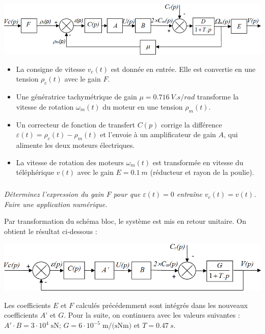 \documentclass[10pt,fleqn]{article} %
\begin{document}
\begin{multicols}{2}
\begin{center}
	\includegraphics[width=\linewidth]{images2/fig_04}
\end{center}

\begin{itemize}
\item La consigne de vitesse $v_c(t)$ est donnée en entrée. Elle est convertie en une tension $\rho_c(t)$ avec le gain $F$.
\item Une génératrice tachymétrique de gain $\mu=\SI{0.716}{V.s/rad}$ transforme la vitesse de rotation $\omega_m(t)$ du moteur en une tension $\rho_m(t)$.
\item Un correcteur de fonction de transfert $C(p)$ corrige la différence $\varepsilon(t)=\rho_c(t)- \rho_m(t)$ et l’envoie à un amplificateur de gain $A$, qui alimente les deux moteurs électriques.
\item La vitesse de rotation des moteurs $\omega_m(t)$ est transformée en vitesse du téléphérique $v(t)$ avec le gain $E=\SI{0,1}{m}$ (réducteur et rayon de la poulie).
\end{itemize}


\subparagraph{}
\textit{Déterminez l’expression du gain $F$ pour que $\varepsilon(t)=0$ entraîne $v_c(t)=v(t)$. Faire une application numérique.}

Par transformation du schéma bloc, le système est mis en retour unitaire. On obtient le résultat ci-dessous :
\begin{center}
	\includegraphics[width=\linewidth]{images2/fig_05}
\end{center}

	Les coefficients $E$ et $F$ calculés précédemment sont intégrés dans les nouveaux coefficients $A’$ et $G$. Pour la suite, on continuera avec les valeurs suivantes : $A'\cdot B=3\cdot 10^{4}\;\text{sN}$; $G=6\cdot 10^{-5}\;\text{m/(sNm)}$ et $T=\SI{0,47}{s}$.
	

\end{multicols}
\end{document}
